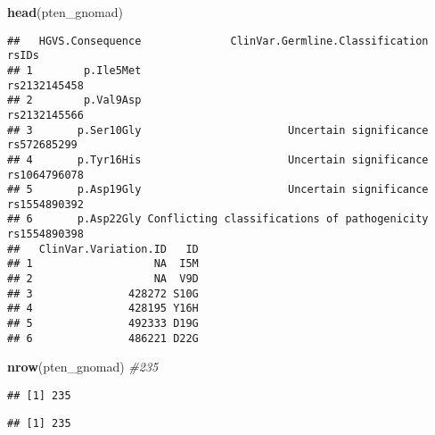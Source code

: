 \documentclass[
]{article}
\newenvironment{Shaded}{\begin{snugshade}}{\end{snugshade}}
\newcommand{\AttributeTok}[1]{\textcolor[rgb]{0.13,0.29,0.53}{#1}}
\newcommand{\CommentTok}[1]{\textcolor[rgb]{0.56,0.35,0.01}{\textit{#1}}}
\newcommand{\ConstantTok}[1]{\textcolor[rgb]{0.56,0.35,0.01}{#1}}
\newcommand{\FunctionTok}[1]{\textcolor[rgb]{0.13,0.29,0.53}{\textbf{#1}}}
\newcommand{\NormalTok}[1]{#1}
\newcommand{\OtherTok}[1]{\textcolor[rgb]{0.56,0.35,0.01}{#1}}
\newcommand{\SpecialCharTok}[1]{\textcolor[rgb]{0.81,0.36,0.00}{\textbf{#1}}}
\newcommand{\StringTok}[1]{\textcolor[rgb]{0.31,0.60,0.02}{#1}}
\begin{document}
\begin{Shaded}
\begin{Highlighting}[]
\FunctionTok{head}\NormalTok{(pten\_gnomad)}
\end{Highlighting}
\end{Shaded}

\begin{verbatim}
##   HGVS.Consequence              ClinVar.Germline.Classification        rsIDs
## 1        p.Ile5Met                                              rs2132145458
## 2        p.Val9Asp                                              rs2132145566
## 3       p.Ser10Gly                       Uncertain significance  rs572685299
## 4       p.Tyr16His                       Uncertain significance rs1064796078
## 5       p.Asp19Gly                       Uncertain significance rs1554890392
## 6       p.Asp22Gly Conflicting classifications of pathogenicity rs1554890398
##   ClinVar.Variation.ID   ID
## 1                   NA  I5M
## 2                   NA  V9D
## 3               428272 S10G
## 4               428195 Y16H
## 5               492333 D19G
## 6               486221 D22G
\end{verbatim}

\begin{Shaded}
\begin{Highlighting}[]
\FunctionTok{nrow}\NormalTok{(pten\_gnomad) }\CommentTok{\#235}
\end{Highlighting}
\end{Shaded}

\begin{verbatim}
## [1] 235
\end{verbatim}

\begin{Shaded}
\end{Shaded}

\begin{verbatim}
## [1] 235
\end{verbatim}

\begin{Shaded}
\end{Shaded}
\end{document}
